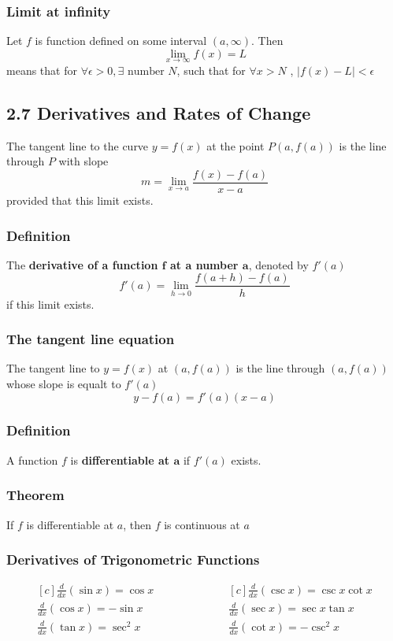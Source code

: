 \documentclass{article}
\begin{document}
\subsubsection*{Limit at infinity}
Let \(f\) is function defined on some interval  \( (a, \infty ) \). Then 
\[
\lim_{x \to \infty} f(x) = L
\]
means that for \( \forall \epsilon > 0 , \exists \text{ number } N \), such that 
for \( \forall x > N \) , \( |f(x) - L| < \epsilon \)

\subsection*{2.7 Derivatives and Rates of Change}
The tangent line to the curve \(y=f(x)\) at the point \(P(a,f(a))\) is the line through \(P\) with slope 
\[
m = \lim_{x \to a} \frac{f(x)-f(a)}{x-a}
\]
provided that this limit exists.

\subsubsection*{Definition}
The \textbf{derivative of a function \(\boldsymbol{f}\) at a number \(\boldsymbol{a}\)}, denoted by \(f'(a)\)
\[
f'(a) = \lim_{h \to 0} \frac{f(a+h) - f(a)}{h}
\]
if this limit exists.

\subsubsection*{The tangent line equation}
The tangent line to \(y=f(x)\) at \( (a,f(a)) \) is the line through \( (a,f(a)) \) whose slope is equalt to \(f'(a)\)
\[
y - f(a) = f'(a)(x-a)
\]

\subsubsection*{Definition}
A function \(f\) is \textbf{differentiable at \(\boldsymbol{a}\)} if \(f'(a)\) exists.

\subsubsection*{Theorem}
If \(f\) is differentiable at \(a\), then \(f\) is continuous at \(a\)

\subsubsection*{Derivatives of Trigonometric Functions}
\begin{equation*}
\begin{aligned}[c]
\frac{d}{dx} (\sin x) = \cos x	\\
\frac{d}{dx} (\cos x) = -\sin x	\\
\frac{d}{dx} (\tan x) = \sec^2 x
\end{aligned}
\qquad\qquad\qquad
\begin{aligned}[c]
\frac{d}{dx} (\csc x) = \csc x \cot	x \\
\frac{d}{dx} (\sec x) = \sec x \tan	x \\
\frac{d}{dx} (\cot x) = -\csc^2 x
\end{aligned}
\end{equation*}
\end{document}
